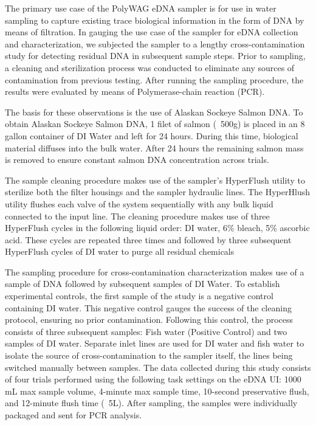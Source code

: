 \documentclass[11pt, letterpaper]{article}
\begin{document}
The primary use case of the PolyWAG eDNA sampler is for use in water sampling to capture existing trace biological information in the form of DNA by means of filtration. In gauging the use case of the sampler for eDNA collection and characterization, we subjected the sampler to a lengthy cross-contamination study for detecting residual DNA in subsequent sample steps. Prior to sampling, a cleaning and sterilization process was conducted to eliminate any sources of contamination from previous testing. After running the sampling procedure, the results were evaluated by means of Polymerase-chain reaction (PCR).
\newline\par
The basis for these observations is the use of Alaskan Sockeye Salmon DNA. To obtain Alaskan Sockeye Salmon DNA, 1 filet of salmon (~500g) is placed in an 8 gallon container of DI Water and left for 24 hours. During this time, biological material diffuses into the bulk water. After 24 hours the remaining salmon mass is removed to ensure constant salmon DNA concentration across trials.
\newline\par
The sample cleaning procedure makes use of the sampler’s HyperFlush utility to sterilize both the filter housings and the sampler hydraulic lines. The HyperHlush utility flushes each valve of the system sequentially with any bulk liquid connected to the input line. The cleaning procedure makes use of three HyperFlush cycles in the following liquid order: DI water, 6\% bleach, 5\% ascorbic acid. These cycles are repeated three times and followed by three subsequent HyperFlush cycles of DI water to purge all residual chemicals
\newline\par
The sampling procedure for cross-contamination characterization makes use of a sample of DNA followed by subsequent samples of DI Water. To establish experimental controls, the first sample of the study is a negative control containing DI water. This negative control gauges the success of the cleaning protocol, ensuring no prior contamination. Following this control, the process consists of three subsequent samples: Fish water (Positive Control) and two samples of DI water. Separate inlet lines are used for DI water and fish water to isolate the source of cross-contamination to the sampler itself, the lines being switched manually between samples. The data collected during this study consists of four trials performed using the following task settings on the eDNA UI: 1000 mL max sample volume, 4-minute max sample time, 10-second preservative flush, and 12-minute flush time (~5L). After sampling, the samples were individually packaged and sent for PCR analysis. 
\end{document}
